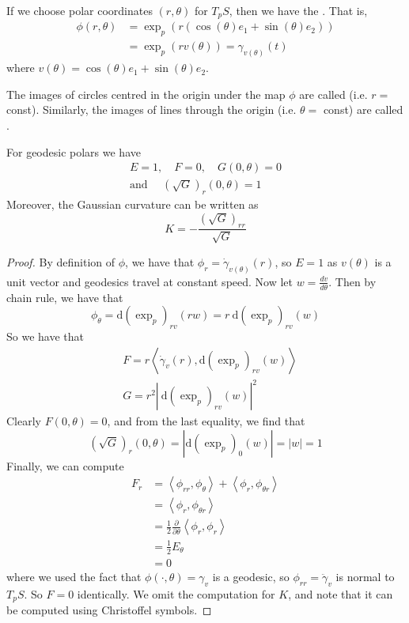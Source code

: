 \documentclass[10pt]{article}
\begin{document}
\begin{definition}
    If we choose polar coordinates $(r, \theta)$ for $T_p S$, then we have the . That is,
\begin{align*}
    \phi(r, \theta)&=\exp _p\left(r\left(\cos (\theta) e_1+\sin (\theta) e_2\right)\right)\\&=\exp _p(r v(\theta))=\gamma_{v(\theta)}(t)
\end{align*}
where $v(\theta)=\cos (\theta) e_1+\sin (\theta) e_2$.
\end{definition}

\begin{definition}
    The images of circles centred in the origin under the map $\phi$ are called  (i.e. $r=$ const). Similarly, the images of lines through the origin (i.e. $\theta=$ const) are called .
\end{definition}

\begin{proposition}
For geodesic polars we have
\begin{align*}
E=1, \quad F=0, \quad G(0, \theta)=0 \\
\text {and } \quad(\sqrt{G})_r(0, \theta)=1
\end{align*}
Moreover, the Gaussian curvature can be written as
$$
K=-\frac{(\sqrt{G})_{r r}}{\sqrt{G}}
$$
\end{proposition}
\begin{proof}
By definition of $\phi$, we have that $\phi_r=\dot{\gamma}_{v(\theta)}(r)$, so $E=1$ as $v(\theta)$ is a unit vector and geodesics travel at constant speed. Now let $w=\frac{d v}{d \theta}$. Then by chain rule, we have that
$$
\phi_\theta=\mathrm{d}\left(\exp _p\right)_{r v}(r w)=r \mathrm{~d}\left(\exp _p\right)_{r v}(w)
$$
So we have that
$$
\begin{aligned}
& F=r\left\langle\dot{\gamma}_v(r), \mathrm{d}\left(\exp _p\right)_{r v}(w)\right\rangle \\
& G=r^2\left|\mathrm{~d}\left(\exp _p\right)_{r v}(w)\right|^2
\end{aligned}
$$
Clearly $F(0, \theta)=0$, and from the last equality, we find that
$$
(\sqrt{G})_r(0, \theta)=\left|\mathrm{d}\left(\exp _p\right)_0(w)\right|=|w|=1
$$
Finally, we can compute
$$
\begin{aligned}
F_r & =\left\langle\phi_{r r}, \phi_\theta\right\rangle+\left\langle\phi_r, \phi_{\theta r}\right\rangle \\
& =\left\langle\phi_r, \phi_{\theta r}\right\rangle \\
& =\frac{1}{2} \frac{\partial}{\partial \theta}\left\langle\phi_r, \phi_r\right\rangle \\
& =\frac{1}{2} E_\theta \\
& =0
\end{aligned}
$$
where we used the fact that $\phi(\cdot, \theta)=\gamma_v$ is a geodesic, so $\phi_{r r}=\ddot{\gamma}_v$ is normal to $T_p S$. So $F=0$ identically. We omit the computation for $K$, and note that it can be computed using Christoffel symbols.
\end{proof}
\end{document}
